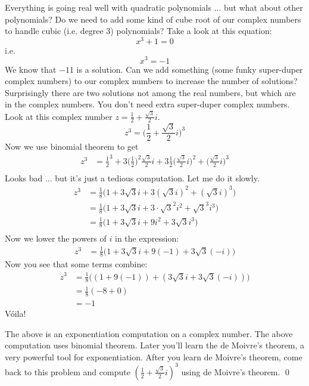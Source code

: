 Everything is going real well with quadratic polynomials ... but what about 
other polynomials?
Do we need to add some kind of cube root of our complex numbers to 
handle cubic (i.e. degree 3) polynomials?
Take a look at this equation:
\[
x^3 + 1 = 0
\]
i.e.
\[
x^3 = -1
\]
We know that $-11$ is a solution.
Can we add something (some funky super-duper complex numbers) 
to our complex numbers to increase the number of solutions?
Surprisingly there are two solutions not among the real numbers, but which
are in the complex numbers. 
You don't need extra super-duper complex numbers.
Look at this complex number
$z = \frac{1}{2} + \frac{\sqrt{3}}{2}i$.
\[
z^3 = \biggl( \frac{1}{2} + \frac{\sqrt{3}}{2}i \biggr)^3
\]
Now we use binomial theorem to get
\begin{align*}
z^3 
&= \frac{1}{2}^3 + 
3 \biggl( \frac{1}{2} \biggr) ^2 \frac{\sqrt{3}}{2}i + 
3\frac{1}{2} \biggl( \frac{\sqrt{3}}{2}i \biggr)^2 + 
\biggl( \frac{\sqrt{3}}{2}i \biggr)^3\\
\end{align*}
Looks bad ... but it's just a tedious computation.
Let me do it slowly.
\begin{align*}
z^3 
&= \frac{1}{8}
\biggl(
1 + 
3 \sqrt{3}i + 
3 (\sqrt{3}i)^2 + 
(\sqrt{3}i)^3
\biggr) \\
&= \frac{1}{8}
\biggl(
1 + 
3 \sqrt{3}i + 
3 \cdot \sqrt{3}^2 i^2 + 
\sqrt{3}^3 i^3
\biggr)
\\
&= \frac{1}{8}
\biggl(
1 + 
3 \sqrt{3}i + 
9 i^2 + 
3 \sqrt{3} i^3
\biggr)
\\
\end{align*}
Now we lower the powers of $i$ in the expression:
\begin{align*}
z^3 
&= \frac{1}{8}
\biggl(
1 + 
3 \sqrt{3}i + 
9 (-1) + 
3 \sqrt{3} (-i)
\biggr)
\end{align*}
Now you see that some terms combine:
\begin{align*}
z^3 
&= \frac{1}{8}
\biggl(
(1 + 9(-1))+ 
(3 \sqrt{3}i +  3 \sqrt{3} (-i))
\biggr) \\
&= \frac{1}{8} (-8 + 0) \\
&= -1
\end{align*}
V\'oila!

\begin{ex}
  The above is an exponentiation computation on
  a complex number.
  The above computation uses binomial theorem.
  Later you'll learn the 
  de Moivre's theorem, a very powerful tool for exponentiation.
  After you learn de Moivre's theorem, come back to this problem
  and compute
  $\left(\frac{1}{2} + \frac{\sqrt{3}}{2}i \right)^3$
  using de Moivre's theorem.
  \qed
\end{ex}

